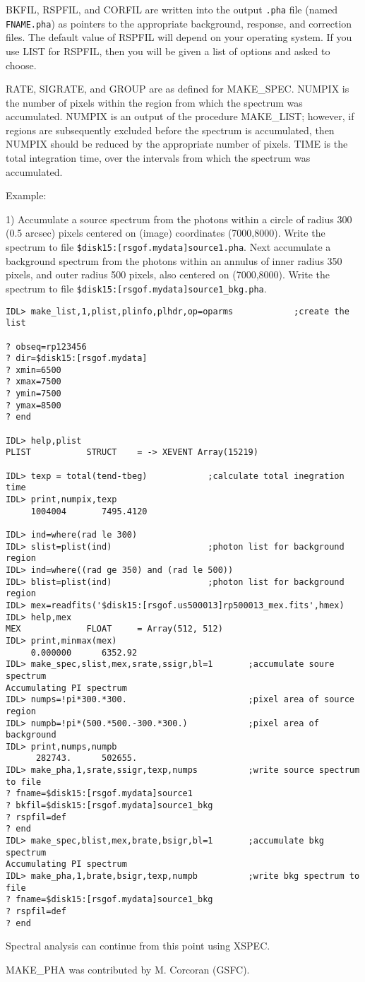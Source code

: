 BKFIL, RSPFIL, and CORFIL are written into the output {\tt .pha} file (named
{\tt FNAME.pha}) as pointers to the appropriate background, response, and
correction files. The default value of RSPFIL will depend on your operating
system. If you use LIST for RSPFIL, then you will be given a list of options
and asked to choose.
 
RATE, SIGRATE, and GROUP are as defined for MAKE{\_}SPEC. NUMPIX is the number of
pixels within the region from which the spectrum was accumulated. NUMPIX is an
output of the procedure MAKE{\_}LIST; however, if regions are subsequently
excluded before the spectrum is accumulated, then NUMPIX should be reduced by
the appropriate number of pixels. TIME is the total integration time, over the
intervals from which the spectrum was accumulated.
 
Example:
 
1) Accumulate a source spectrum from the photons within a circle of radius 300
(0.5 arcsec) pixels centered on (image) coordinates (7000,8000). Write the
spectrum to file {\tt \$disk15:[rsgof.mydata]source1.pha}. Next accumulate a
background spectrum from the photons within an annulus of inner radius 350
pixels, and outer radius 500 pixels, also centered on (7000,8000). Write the
spectrum to file {\tt \$disk15:[rsgof.mydata]source1{\_}bkg.pha}.

\medskip\noindent
\begin{verbatim}
IDL> make_list,1,plist,plinfo,plhdr,op=oparms            ;create the list
 
? obseq=rp123456
? dir=$disk15:[rsgof.mydata]
? xmin=6500
? xmax=7500
? ymin=7500
? ymax=8500
? end
 
IDL> help,plist
PLIST           STRUCT    = -> XEVENT Array(15219)
 
IDL> texp = total(tend-tbeg)            ;calculate total inegration time
IDL> print,numpix,texp
     1004004       7495.4120
 
IDL> ind=where(rad le 300)		
IDL> slist=plist(ind)                   ;photon list for background region
IDL> ind=where((rad ge 350) and (rad le 500))
IDL> blist=plist(ind)                   ;photon list for background region
IDL> mex=readfits('$disk15:[rsgof.us500013]rp500013_mex.fits',hmex)
IDL> help,mex
MEX             FLOAT     = Array(512, 512)
IDL> print,minmax(mex)
     0.000000      6352.92
IDL> make_spec,slist,mex,srate,ssigr,bl=1       ;accumulate soure spectrum
Accumulating PI spectrum
IDL> numps=!pi*300.*300.                        ;pixel area of source region
IDL> numpb=!pi*(500.*500.-300.*300.)            ;pixel area of background
IDL> print,numps,numpb
      282743.      502655.
IDL> make_pha,1,srate,ssigr,texp,numps          ;write source spectrum to file
? fname=$disk15:[rsgof.mydata]source1
? bkfil=$disk15:[rsgof.mydata]source1_bkg
? rspfil=def
? end
IDL> make_spec,blist,mex,brate,bsigr,bl=1       ;accumulate bkg spectrum
Accumulating PI spectrum
IDL> make_pha,1,brate,bsigr,texp,numpb          ;write bkg spectrum to file
? fname=$disk15:[rsgof.mydata]source1_bkg
? rspfil=def
? end
\end{verbatim}
Spectral analysis can continue from this point using XSPEC.
 
MAKE{\_}PHA was contributed by M. Corcoran (GSFC).
